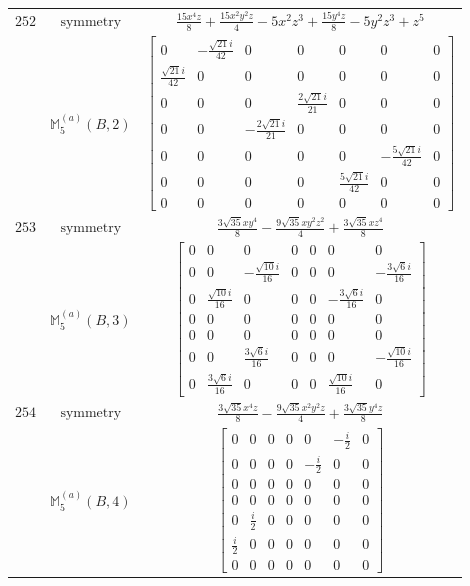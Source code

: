\documentclass[fleqn,8pt,landscape]{jsarticle}
\begin{document}
\begin{longtable}{ccc}
$ 252 $ & $ \text{symmetry} $ & $ \frac{15 x^{4} z}{8} + \frac{15 x^{2} y^{2} z}{4} - 5 x^{2} z^{3} + \frac{15 y^{4} z}{8} - 5 y^{2} z^{3} + z^{5} $ \\
$  $ & $ \mathbb{M}_{5}^{(a)}(B,2) $ & $ \begin{bmatrix} 0 & - \frac{\sqrt{21} i}{42} & 0 & 0 & 0 & 0 & 0 \\ \frac{\sqrt{21} i}{42} & 0 & 0 & 0 & 0 & 0 & 0 \\ 0 & 0 & 0 & \frac{2 \sqrt{21} i}{21} & 0 & 0 & 0 \\ 0 & 0 & - \frac{2 \sqrt{21} i}{21} & 0 & 0 & 0 & 0 \\ 0 & 0 & 0 & 0 & 0 & - \frac{5 \sqrt{21} i}{42} & 0 \\ 0 & 0 & 0 & 0 & \frac{5 \sqrt{21} i}{42} & 0 & 0 \\ 0 & 0 & 0 & 0 & 0 & 0 & 0 \end{bmatrix} $ \\ \hline
$ 253 $ & $ \text{symmetry} $ & $ \frac{3 \sqrt{35} x y^{4}}{8} - \frac{9 \sqrt{35} x y^{2} z^{2}}{4} + \frac{3 \sqrt{35} x z^{4}}{8} $ \\
$  $ & $ \mathbb{M}_{5}^{(a)}(B,3) $ & $ \begin{bmatrix} 0 & 0 & 0 & 0 & 0 & 0 & 0 \\ 0 & 0 & - \frac{\sqrt{10} i}{16} & 0 & 0 & 0 & - \frac{3 \sqrt{6} i}{16} \\ 0 & \frac{\sqrt{10} i}{16} & 0 & 0 & 0 & - \frac{3 \sqrt{6} i}{16} & 0 \\ 0 & 0 & 0 & 0 & 0 & 0 & 0 \\ 0 & 0 & 0 & 0 & 0 & 0 & 0 \\ 0 & 0 & \frac{3 \sqrt{6} i}{16} & 0 & 0 & 0 & - \frac{\sqrt{10} i}{16} \\ 0 & \frac{3 \sqrt{6} i}{16} & 0 & 0 & 0 & \frac{\sqrt{10} i}{16} & 0 \end{bmatrix} $ \\ \hline
$ 254 $ & $ \text{symmetry} $ & $ \frac{3 \sqrt{35} x^{4} z}{8} - \frac{9 \sqrt{35} x^{2} y^{2} z}{4} + \frac{3 \sqrt{35} y^{4} z}{8} $ \\
$  $ & $ \mathbb{M}_{5}^{(a)}(B,4) $ & $ \begin{bmatrix} 0 & 0 & 0 & 0 & 0 & - \frac{i}{2} & 0 \\ 0 & 0 & 0 & 0 & - \frac{i}{2} & 0 & 0 \\ 0 & 0 & 0 & 0 & 0 & 0 & 0 \\ 0 & 0 & 0 & 0 & 0 & 0 & 0 \\ 0 & \frac{i}{2} & 0 & 0 & 0 & 0 & 0 \\ \frac{i}{2} & 0 & 0 & 0 & 0 & 0 & 0 \\ 0 & 0 & 0 & 0 & 0 & 0 & 0 \end{bmatrix} $ \\ \hline

\end{longtable}
\end{document}
